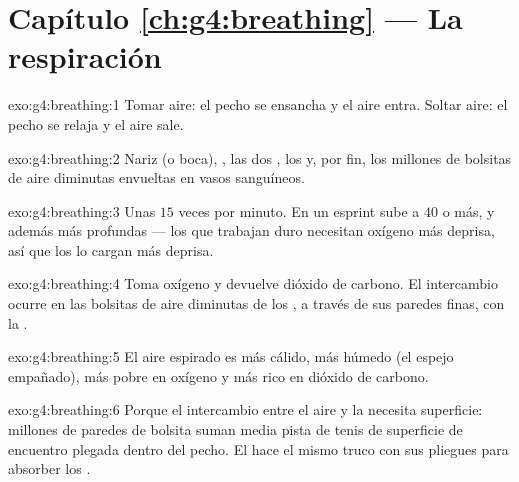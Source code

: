 \section*{Capítulo \ref{ch:g4:breathing} --- La respiración}

\begin{solution}{exo:g4:breathing:1}
Tomar aire: el pecho se ensancha y el aire entra. Soltar aire: el
pecho se relaja y el aire sale.
\end{solution}

\begin{solution}{exo:g4:breathing:2}
Nariz (o boca), , las dos , los  y, por fin, los
millones de bolsitas de aire diminutas envueltas en vasos sanguíneos.
\end{solution}

\begin{solution}{exo:g4:breathing:3}
Unas $15$ veces por minuto. En un esprint sube a $40$ o más, y además
más profundas --- los  que trabajan duro necesitan oxígeno más
deprisa, así que los  lo cargan más deprisa.
\end{solution}

\begin{solution}{exo:g4:breathing:4}
Toma oxígeno y devuelve dióxido de carbono. El intercambio ocurre en
las bolsitas de aire diminutas de los , a través de sus
paredes finas, con la .
\end{solution}

\begin{solution}{exo:g4:breathing:5}
El aire espirado es más cálido, más húmedo (el espejo empañado), más
pobre en oxígeno y más rico en dióxido de carbono.
\end{solution}

\begin{solution}{exo:g4:breathing:6}
Porque el intercambio entre el aire y la  necesita superficie:
millones de paredes de bolsita suman media pista de tenis de
superficie de encuentro plegada dentro del pecho. El 
hace el mismo truco con sus pliegues para absorber los .
\end{solution}

